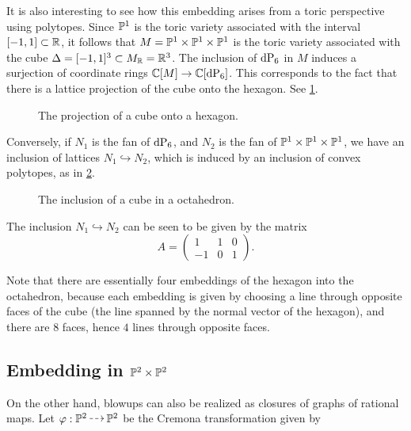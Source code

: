 It is also interesting to see how this embedding arises from a toric perspective using polytopes. Since $\P^1$ is the toric variety associated with the interval $[-1,1] \subset \R$, it follows that $M = \P^1 \times \P^1 \times \P^1$ is the toric variety associated with the cube $\Delta = [-1,1]^3 \subset M_\R = \R^3$. The inclusion of $\dP6$ in $M$ induces a surjection of coordinate rings $\C[M] \to \C[\dP6]$. This corresponds to the fact that there is a lattice projection of the cube onto the hexagon. See \cref{fig:cube_projection}.

\begin{figure}
\centering 

\caption{The projection of a cube onto a hexagon.}
\label{fig:cube_projection}
\end{figure}

Conversely, if $N_1$ is the fan of $\dP6$, and $N_2$ is the fan of $\P^1 \times \P^1 \times \P^1$, we have an inclusion of lattices $N_1 \hookrightarrow N_2$, which is induced by an inclusion of convex polytopes, as in \cref{fig:octahedron_hexagon}.

 \begin{figure}
\centering 

\caption{The inclusion of a cube in a octahedron.}
\label{fig:octahedron_hexagon}
\end{figure}

The inclusion $N_1 \hookrightarrow N_2$ can be seen to be given by the matrix
\begin{equation}
\label{eq:A}
A = 
\begin{pmatrix}
1 & 1 & 0 \\
-1 & 0 & 1
\end{pmatrix}.
\end{equation}

Note that there are essentially four embeddings of the hexagon into the octahedron, because each embedding is given by choosing a line through opposite faces of the cube (the line spanned by the normal vector of the hexagon), and there are $8$ faces, hence $4$ lines through opposite faces.

\subsection{Embedding in $\P^2 \times \P^2$}

On the other hand, blowups can also be realized as closures of graphs of rational maps. Let $\varphi: \P^2 \rmap \P^2$ be the Cremona transformation given by

